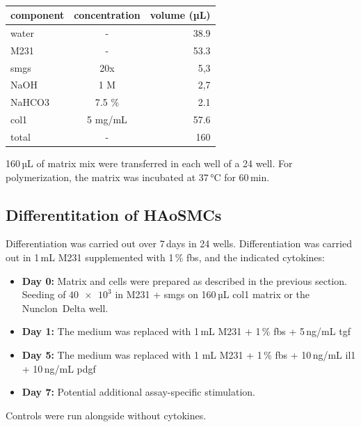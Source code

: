     \begin{table}[h]
    \capstart
	\centering
	\begin{minipage}{\captionwidth}
	   	\caption[Col I matrix]{}
	   	\label{tab:matrix}
	\end{minipage}
    \begin{tabular}{|l|c|r|}
        \hline
        component & concentration & volume (µL) \\ \hline
        \ac{water}       & -             & 38.9        \\
        \ac{M231}      & -             & 53.3        \\
        \ac{smgs}      & 20x           & 5,3         \\
        NaOH      & 1 M           & 2,7         \\
        NaHCO3    & 7.5 \%        & 2.1         \\
        \ac{col1}    & 5 mg/mL       & 57.6        \\ \hline
        total     & -             & 160         \\ \hline
    \end{tabular}
    \end{table}

    160\,µL of matrix mix were transferred in each well of a \ac{24 well}. For polymerization, the matrix was incubated at 37\,°C for 60\,min.

    \subsection{Differentitation of HAoSMCs}
    \label{subsec:differentiation}
    Differentiation was carried out over 7\,days in \acp{24 well}. Differentiation was carried out in 1\,mL M231 supplemented with 1\,\% \ac{fbs}, and the indicated cytokines:
    \begin{itemize}
        \item \textbf{Day 0:} Matrix and cells were prepared as described in the previous section. Seeding of $\num{40e3}$ in \ac{M231} + \ac{smgs} on 160\,µL \ac{col1} matrix or the Nunclon\texttrademark~Delta well.
        \item \textbf{Day 1:} The medium was replaced with 1\,mL M231 + 1\,\% \ac{fbs} + 5\,ng/mL \ac{tgf}
        \item \textbf{Day 5:} The medium was replaced with 1 mL M231 + 1\,\% \ac{fbs} + 10\,ng/mL \ac{il1} + 10\,ng/mL \ac{pdgf}
        \item \textbf{Day 7:} Potential additional assay-specific stimulation.
    \end{itemize}
    Controls were run alongside without cytokines.

